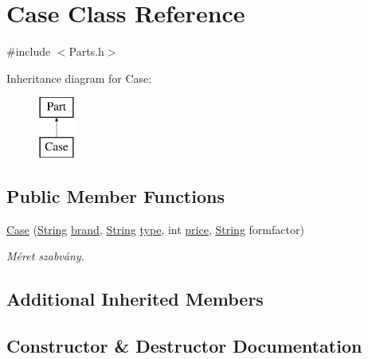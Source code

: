 \hypertarget{class_case}{}\section{Case Class Reference}
\label{class_case}


{\ttfamily \#include $<$Parts.\+h$>$}

Inheritance diagram for Case\+:\begin{figure}[H]
\begin{center}
\leavevmode
\includegraphics[height=2.000000cm]{class_case}
\end{center}
\end{figure}
\subsection*{Public Member Functions}
\begin{DoxyCompactItemize}
\item 
\mbox{\hyperlink{class_case_a0d953adffc664636549235d729f13260}{Case}} (\mbox{\hyperlink{class_string}{String}} \mbox{\hyperlink{class_part_ae06f2fdeb7fbbdb229a7aca151f3e341}{brand}}, \mbox{\hyperlink{class_string}{String}} \mbox{\hyperlink{class_part_a101dbcc5c4b21564df7414c7eb0eae88}{type}}, int \mbox{\hyperlink{class_part_a8e71223aed1da95a974f33d8d6c91bb1}{price}}, \mbox{\hyperlink{class_string}{String}} formfactor)
\begin{DoxyCompactList}\small\item\em Méret szabvány. \end{DoxyCompactList}\end{DoxyCompactItemize}
\subsection*{Additional Inherited Members}


\subsection{Constructor \& Destructor Documentation}
\mbox{\label{class_case_a0d953adffc664636549235d729f13260}} 

